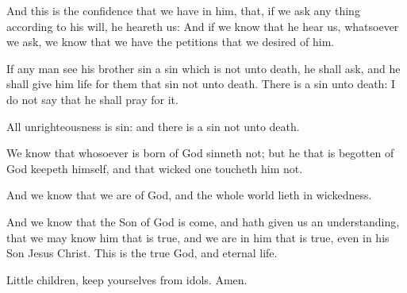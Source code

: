 \Verse And this is the confidence that we have in him, that, if we ask any thing according to his will, he heareth us: \Verse And if we know that he hear us, whatsoever we ask, we know that we have the petitions that we desired of him.

\Verse If any man see his brother sin a sin which is not unto death, he shall ask, and he shall give him life for them that sin not unto death. There is a sin unto death: I do not say that he shall pray for it.

\Verse All unrighteousness is sin: and there is a sin not unto death.

\Verse We know that whosoever is born of God sinneth not; but he that is begotten of God keepeth himself, and that wicked one toucheth him not.

\Verse And we know that we are of God, and the whole world lieth in wickedness.

\Verse And we know that the Son of God is come, and hath given us an understanding, that we may know him that is true, and we are in him that is true, even in his Son Jesus Christ. This is the true God, and eternal life.

\Verse Little children, keep yourselves from idols. Amen.

